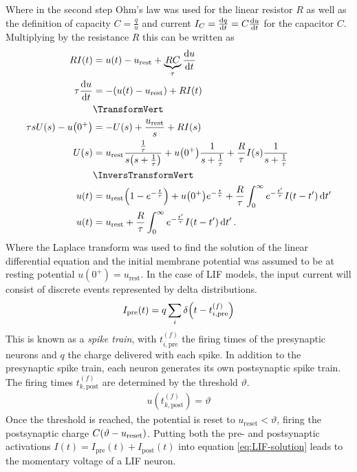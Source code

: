 Where in the second step Ohm's law was used for the linear resistor $R$ as well as the definition of capacity $C=\frac{q}{u}$ and current $I_C=\dv{q}{t}=C\dv{u}{t}$ for the capacitor $C$.\\
Multiplying by the resistance $R$ this can be written as
\begin{align}
    R I(t) &=  u(t) - u_\mathrm{rest}+\underbrace{RC}_{\tau}\dv{u}{t}\\
    \tau \dv{u}{t}&= -\qty(u(t)-u_\mathrm{rest})+RI(t)\label{eq:LIF}\\
    &\TransformVert\\
    \tau s U(s) - u\qty(0^+) &= -U(s)+\frac{u_\mathrm{rest}}{s}+R I(s)\\
    U(s) &= u_\mathrm{rest}\frac{\frac{1}{\tau}}{s\qty(s+\frac{1}{\tau})}+u\qty(0^+)\frac{1}{s+\frac{1}{\tau}}+\frac{R}{\tau}I(s) \frac{1}{s+\frac{1}{\tau}}\\
    &\InversTransformVert\\
    u(t) &= u_\mathrm{rest}\qty(1-e^{-\frac{t}{\tau}})+u\qty(0^+)e^{-\frac{t}{\tau}}+\frac{R}{\tau}\int_0^\infty e^{-\frac{t'}{\tau}}I(t-t')\dd{t'}\\
    u(t)&=u_\mathrm{rest}+\frac{R}{\tau}\int_0^\infty e^{-\frac{t'}{\tau}}I(t-t')\dd{t'}\label{eq:LIF-solution}.
\end{align}
Where the Laplace transform was used to find the solution of the linear differential equation and the initial membrane potential was assumed to be at resting potential $u(0^+)=u_\mathrm{rest}$. In the case of LIF models, the input current will consist of discrete events represented by delta distributions.
\begin{align}
    I_\mathrm{pre}(t) = q\sum_i \delta\qty(t-t_{i,\mathrm{pre}}^{(f)})
\end{align}
This is known as a \emph{spike train}, with $t_{i,\mathrm{pre}}^{(f)}$ the firing times of the presynaptic neurons and $q$ the charge delivered with each spike. In addition to the presynaptic spike train, each neuron generates its own postsynaptic spike train. The firing times $t_{k,\mathrm{post}}^{(f)}$ are determined by the threshold $\vartheta$.
\begin{align}
    u(t_{k,\mathrm{post}}^{(f)})=\vartheta
\end{align}
Once the threshold is reached, the potential is reset to $u_\mathrm{reset} < \vartheta$, firing the postsynaptic charge $C\qty(\vartheta-u_\mathrm{reset})$. Putting both the pre- and postsynaptic activations $I(t)=I_\mathrm{pre}(t)+I_\mathrm{post}(t)$ into equation \ref{eq:LIF-solution} leads to the momentary voltage of a LIF neuron.
